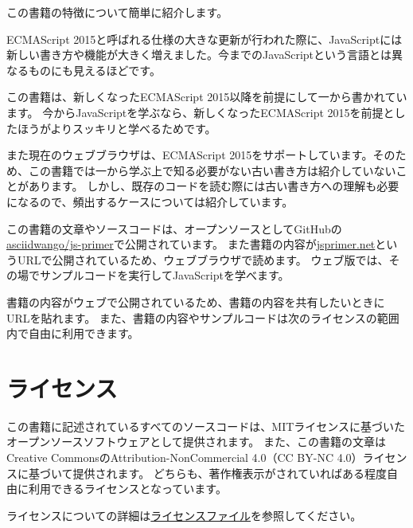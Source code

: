 この書籍の特徴について簡単に紹介します。

ECMAScript
2015と呼ばれる仕様の大きな更新が行われた際に、JavaScriptには新しい書き方や機能が大きく増えました。今までのJavaScriptという言語とは異なるものにも見えるほどです。

この書籍は、新しくなったECMAScript
2015以降を前提にして一から書かれています。
今からJavaScriptを学ぶなら、新しくなったECMAScript
2015を前提としたほうがよりスッキリと学べるためです。

また現在のウェブブラウザは、ECMAScript
2015をサポートしています。そのため、この書籍では一から学ぶ上で知る必要がない古い書き方は紹介していないことがあります。
しかし、既存のコードを読む際には古い書き方への理解も必要になるので、頻出するケースについては紹介しています。

この書籍の文章やソースコードは、オープンソースとしてGitHubの\href{https://github.com/asciidwango/js-primer}{asciidwango/js-primer}で公開されています。
また書籍の内容が\href{https://jsprimer.net/}{jsprimer.net}というURLで公開されているため、ウェブブラウザで読めます。
ウェブ版では、その場でサンプルコードを実行してJavaScriptを学べます。

書籍の内容がウェブで公開されているため、書籍の内容を共有したいときにURLを貼れます。
また、書籍の内容やサンプルコードは次のライセンスの範囲内で自由に利用できます。

\hypertarget{license}{%
\section*{ライセンス}\label{license}}

この書籍に記述されているすべてのソースコードは、MITライセンスに基づいたオープンソースソフトウェアとして提供されます。
また、この書籍の文章はCreative CommonsのAttribution-NonCommercial
4.0（CC BY-NC 4.0）ライセンスに基づいて提供されます。
どちらも、著作権表示がされていればある程度自由に利用できるライセンスとなっています。

ライセンスについての詳細は\href{https://github.com/asciidwango/js-primer/blob/master/LICENSE}{ライセンスファイル}を参照してください。

